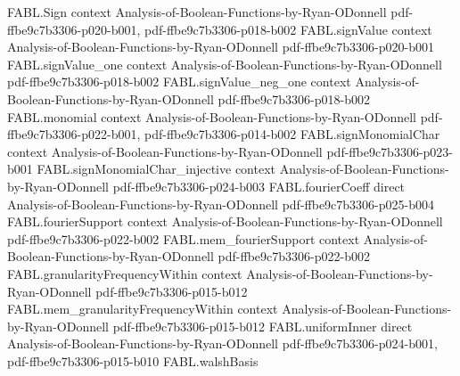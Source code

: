 \begin{theorem}
\label{FABL.e3LinTester_accepts_oddParity_of_accepts_dictators}
\leanok
{}
\proofstep
  {FABL.Sign}
  {context}
  {Analysis-of-Boolean-Functions-by-Ryan-ODonnell}
  {pdf-ffbe9c7b3306-p020-b001,
    pdf-ffbe9c7b3306-p018-b002}
\proofstep
  {FABL.signValue}
  {context}
  {Analysis-of-Boolean-Functions-by-Ryan-ODonnell}
  {pdf-ffbe9c7b3306-p020-b001}
\proofstep
  {FABL.signValue_one}
  {context}
  {Analysis-of-Boolean-Functions-by-Ryan-ODonnell}
  {pdf-ffbe9c7b3306-p018-b002}
\proofstep
  {FABL.signValue_neg_one}
  {context}
  {Analysis-of-Boolean-Functions-by-Ryan-ODonnell}
  {pdf-ffbe9c7b3306-p018-b002}
\proofstep
  {FABL.monomial}
  {context}
  {Analysis-of-Boolean-Functions-by-Ryan-ODonnell}
  {pdf-ffbe9c7b3306-p022-b001,
    pdf-ffbe9c7b3306-p014-b002}
\proofstep
  {FABL.signMonomialChar}
  {context}
  {Analysis-of-Boolean-Functions-by-Ryan-ODonnell}
  {pdf-ffbe9c7b3306-p023-b001}
\proofstep
  {FABL.signMonomialChar_injective}
  {context}
  {Analysis-of-Boolean-Functions-by-Ryan-ODonnell}
  {pdf-ffbe9c7b3306-p024-b003}
\proofstep
  {FABL.fourierCoeff}
  {direct}
  {Analysis-of-Boolean-Functions-by-Ryan-ODonnell}
  {pdf-ffbe9c7b3306-p025-b004}
\proofstep
  {FABL.fourierSupport}
  {context}
  {Analysis-of-Boolean-Functions-by-Ryan-ODonnell}
  {pdf-ffbe9c7b3306-p022-b002}
\proofstep
  {FABL.mem_fourierSupport}
  {context}
  {Analysis-of-Boolean-Functions-by-Ryan-ODonnell}
  {pdf-ffbe9c7b3306-p022-b002}
\proofstep
  {FABL.granularityFrequencyWithin}
  {context}
  {Analysis-of-Boolean-Functions-by-Ryan-ODonnell}
  {pdf-ffbe9c7b3306-p015-b012}
\proofstep
  {FABL.mem_granularityFrequencyWithin}
  {context}
  {Analysis-of-Boolean-Functions-by-Ryan-ODonnell}
  {pdf-ffbe9c7b3306-p015-b012}
\proofstep
  {FABL.uniformInner}
  {direct}
  {Analysis-of-Boolean-Functions-by-Ryan-ODonnell}
  {pdf-ffbe9c7b3306-p024-b001,
    pdf-ffbe9c7b3306-p015-b010}
\proofstep
  {FABL.walshBasis}

\end{theorem}
